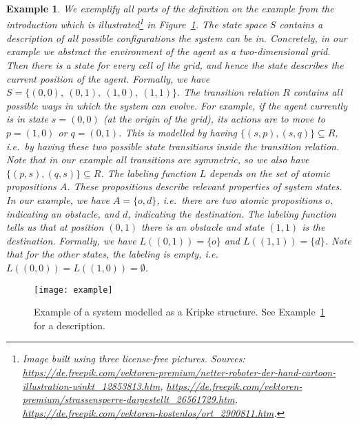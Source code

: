 \documentclass[11pt]{article}
\newtheorem{example}{Example}
\begin{document}
\begin{example}\label{ex:kripke}
	We exemplify all parts of the definition on the example from the introduction which is illustrated\footnote{Image built using three license-free pictures. Sources: \url{https://de.freepik.com/vektoren-premium/netter-roboter-der-hand-cartoon-illustration-winkt_12853813.htm}, \url{https://de.freepik.com/vektoren-premium/strassensperre-dargestellt_26561729.htm}, \url{https://de.freepik.com/vektoren-kostenlos/ort_2900811.htm}.} in Figure~\ref{fig:kripke-example}.
	The state space $S$ contains a description of all possible configurations the system can be in. 
	Concretely, in our example we abstract the environment of the agent as a two-dimensional grid. Then there is a state for every cell of the grid, and hence the state describes the current position of the agent. Formally, we have $S = \{(0,0),~(0,1),~(1,0),~(1,1)\}$.
	The transition relation $R$ contains all possible ways in which the system can evolve. For example, if the agent currently is in state $s=(0,0)$ (at the origin of the grid), its actions are to move to $p=(1,0)$ or $q=(0,1)$.
	This is modelled by having $\{(s,p), (s,q)\} \subseteq R$, i.e.\ by having these two possible state transitions inside the transition relation.
	Note that in our example all transitions are symmetric, so we also have $\{(p,s), (q,s)\} \subseteq R$.
	The labeling function $L$ depends on the set of atomic propositions $A$. These propositions describe relevant properties of system states. 
	In our example, we have $A = \{o,d\}$, i.e.\ there are two atomic propositions $o$, indicating an obstacle, and $d$, indicating the destination.
	The labeling function tells us that at position $(0,1)$ there is an obstacle and state $(1,1)$ is the destination. Formally, we have $L((0,1)) = \{o\}$ and $L((1,1)) = \{d\}$. Note that for the other states, the labeling is empty, i.e.\ $L((0,0))=L((1,0))=\emptyset$.	
\end{example}

\begin{figure}[t]
	\centering
	\texttt{[image: example]}
	\caption{Example of a system modelled as a Kripke structure. See Example~\ref{ex:kripke} for a description.}
	\label{fig:kripke-example}
\end{figure}
\end{document}
